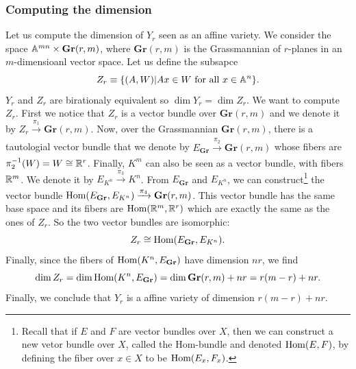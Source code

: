        \subsubsection{Computing the dimension}
            
            Let us compute the dimension of $Y_r$ seen as an affine variety. We consider the space $\mathbb{A}^{mn}\times\textbf{Gr}(r,m)$, where $\textbf{Gr}(r,m)$ is the Grassmannian of $r$-planes in an $m$-dimensioanl vector space. Let us define the subsapce
            \begin{equation}
                Z_r\equiv\{(A,W)|Ax\in W\text{ for all } x\in\mathbb{A}^{n}\}.
            \end{equation}
            $Y_r$ and $Z_r$ are birationaly equivalent so $\dim Y_r=\dim Z_r$. We want to compute $Z_r$. First we notice that $Z_r$ is a vector bundle over $\textbf{Gr}(r,m)$ and we denote it by $Z_r\xrightarrow[]{\pi_1}\textbf{Gr}(r,m)$. Now, over the Grassmannian $\textbf{Gr}(r,m)$, there is a tautologial vector bundle that we denote by $E_{\textbf{Gr}}\xrightarrow[]{\pi_2}\textbf{Gr}(r,m)$ whose fibers are $\pi^{-1}_2(W)=W\cong\mathbb{R}^r$. Finally, $K^m$ can also be seen as a vector bundle, with fibers $\mathbb{R}^m$. We denote it by $E_{K^n}\xrightarrow[]{\pi_3}K^n$. From $E_{\textbf{Gr}}$ and $E_{K^n}$, we can construct\footnote{Recall that if $E$ and $F$ are vector bundles over $X$, then we can construct a new vetor bundle over $X$, called the Hom-bundle and denoted $\text{Hom}(E,F)$, by defining the fiber over $x\in X$ to be $\text{Hom}(E_x,F_x)$.} the vector bundle $\text{Hom}(E_{\textbf{Gr}},E_{K^n})\xrightarrow[]{\pi_4}\textbf{Gr}(r,m)$. This vector bundle has the same base space and its fibers are $\text{Hom}(\mathbb{R}^m,\mathbb{R}^r)$ which are exactly the same as the ones of $Z_r$. So the two vector bundles are isomorphic:
            \begin{equation}
                Z_r\cong\text{Hom}(E_{\textbf{Gr}},E_{K^n}).
            \end{equation}
            Finally, since the fibers of $\text{Hom}(K^n,E_{\textbf{Gr}})$ have dimension $nr$, we find
            \begin{equation}
                \dim Z_r = \dim\text{Hom}(K^n,E_{\textbf{Gr}}) = \dim\textbf{Gr}(r,m)+nr = r(m-r)+nr.
            \end{equation}
            Finally, we conclude that $Y_r$ is a affine variety of dimension $r(m-r)+nr$.

